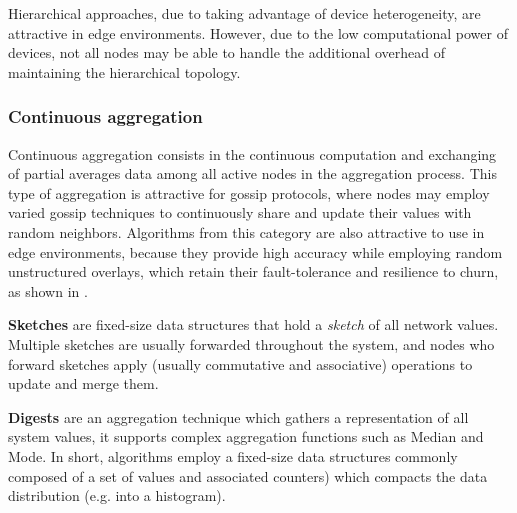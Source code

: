 Hierarchical approaches, due to taking advantage of device heterogeneity, are attractive in edge environments. However, due to the low computational power of devices, not all nodes may be able to handle the additional overhead of maintaining the hierarchical topology.

\subsubsection*{Continuous aggregation}

Continuous aggregation consists in the continuous computation and exchanging of partial averages data among all active nodes in the aggregation process. This type of aggregation is attractive for gossip protocols, where nodes may employ varied gossip techniques to continuously share and update their values with random neighbors. Algorithms from this category are also attractive to use in edge environments, because they provide high accuracy while employing random unstructured overlays, which retain their fault-tolerance and resilience to churn, as shown in \cite{gossip_aggregation}.

\textbf{Sketches} are fixed-size data structures that hold a \textit{sketch} of all network values. Multiple sketches are usually forwarded throughout the system, and nodes who forward sketches apply (usually commutative and associative) operations to update and merge them.

\textbf{Digests} are an aggregation technique which gathers a representation of all system values, it supports complex aggregation functions such as Median and Mode. In short, algorithms employ a fixed-size data structures commonly composed of a set of values and associated counters) which compacts the data distribution (e.g. into a histogram).





